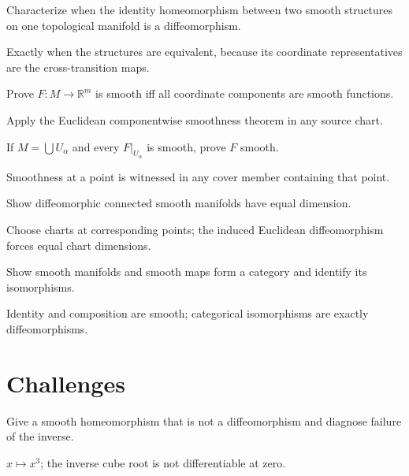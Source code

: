 \begin{problem}\label{prob:vii03-08}
Characterize when the identity homeomorphism between two smooth structures on one topological manifold is a diffeomorphism.
\end{problem}
\begin{solution}
Exactly when the structures are equivalent, because its coordinate representatives are the cross-transition maps.
\end{solution}

\begin{problem}\label{prob:vii03-09}
Prove \(F:M\to\mathbb R^m\) is smooth iff all coordinate components are smooth functions.
\end{problem}
\begin{solution}
Apply the Euclidean componentwise smoothness theorem in any source chart.
\end{solution}

\begin{problem}\label{prob:vii03-10}
If \(M=\bigcup U_\alpha\) and every \(F|_{U_\alpha}\) is smooth, prove \(F\) smooth.
\end{problem}
\begin{solution}
Smoothness at a point is witnessed in any cover member containing that point.
\end{solution}

\begin{problem}\label{prob:vii03-11}
Show diffeomorphic connected smooth manifolds have equal dimension.
\end{problem}
\begin{solution}
Choose charts at corresponding points; the induced Euclidean diffeomorphism forces equal chart dimensions.
\end{solution}

\begin{problem}\label{prob:vii03-12}
Show smooth manifolds and smooth maps form a category and identify its isomorphisms.
\end{problem}
\begin{solution}
Identity and composition are smooth; categorical isomorphisms are exactly diffeomorphisms.
\end{solution}

\section{Challenges}
\begin{problem}[Challenge]\label{chal:vii03-01}
Give a smooth homeomorphism that is not a diffeomorphism and diagnose failure of the inverse.
\end{problem}
\begin{solution}
\(x\mapsto x^3\); the inverse cube root is not differentiable at zero.
\end{solution}

